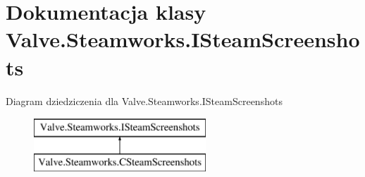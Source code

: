 \hypertarget{class_valve_1_1_steamworks_1_1_i_steam_screenshots}{}\section{Dokumentacja klasy Valve.\+Steamworks.\+I\+Steam\+Screenshots}
\label{class_valve_1_1_steamworks_1_1_i_steam_screenshots}
Diagram dziedziczenia dla Valve.\+Steamworks.\+I\+Steam\+Screenshots\begin{figure}[H]
\begin{center}
\leavevmode
\includegraphics[height=2.000000cm]{class_valve_1_1_steamworks_1_1_i_steam_screenshots}
\end{center}
\end{figure}
